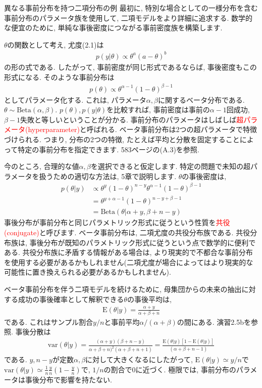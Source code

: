 \documentclass[10pt,dvipdfmx,a4]{beamer}
\newcommand{\eqn}[1]{\begin{align*}#1\end{align*}}
\newcommand{\tcr}[1]{\textcolor{red}{#1}}
\begin{document}
\begin{frame}{異なる事前分布を持つ二項分布の例}
最初に, 特別な場合としての一様分布を含む事前分布のパラメータ族を使用して, 二項モデルをより詳細に追求する.
数学的な便宜のために, 単純な事後密度につながる事前密度族を構築します.

$\theta$の関数として考え, 尤度(2.1)は
\eqn{p(y|\theta)\propto \theta^a(a-\theta)^b}
の形の式である.
したがって, 事前密度が同じ形式であるならば, 事後密度もこの形式になる.
そのような事前分布は
\eqn{p(\theta)\propto \theta^{\alpha-1}(1-\theta)^{\beta-1}}
としてパラメータ化する.
これは, パラメータ$\alpha, \beta$に関するベータ分布である.
$\theta\sim \text{Beta}(\alpha,\beta)$.
$p(\theta), p(y|\theta)$を比較すれば, 事前密度は事前の$\alpha-1$回成功, $\beta-1$失敗と等しいということが分かる.
事前分布のパラメータはしばしば\tcr{超パラメータ(hyperparameter)}と呼ばれる.
ベータ事前分布は2つの超パラメータで特徴づけられる.
つまり, 分布の2つの特徴, たとえば平均と分散を固定することによって特定の事前分布を指定できます.
583ページの(A.3)を参照.
\end{frame}


\begin{frame}
今のところ, 合理的な値$\alpha, \beta$を選択できると仮定します.
特定の問題で未知の超パラメータを扱うための適切な方法は, 5章で説明します.
$\theta$の事後密度は,
\eqn{p(\theta|y)&\propto \theta^y(1-\theta)^{n-y}\theta^{\alpha-1}(1-\theta)^{\beta-1}\\
&=\theta^{y+\alpha-1}(1-\theta)^{n-y+\beta-1}\\
&=\text{Beta}(\theta|\alpha+y,\beta+n-y)}
事後分布が事前分布と同じパラメトリック形式に従うという性質を\tcr{共役(conjugate)}と呼びます.
ベータ事前分布は, 二項尤度の共役分布族である.
共役分布族は, 事後分布が既知のパラメトリック形式に従うという点で数学的に便利である.
共役分布族に矛盾する情報がある場合は, より現実的で不都合な事前分布を使用する必要があるかもしれません(二項尤度が場合によってはより現実的な可能性に置き換えられる必要があるかもしれません).
\end{frame}


\begin{frame}
ベータ事前分布を伴う二項モデルを続けるために, 母集団からの未来の抽出に対する成功の事後確率として解釈できる$\theta$の事後平均は,
\eqn{\text{E}(\theta|y)=\frac{\alpha+y}{\alpha+\beta+n}}
である.
これはサンプル割合$y/n$と事前平均$\alpha/(\alpha+\beta)$の間にある.
演習2.5bを参照.
事後分散は
\eqn{\text{var}(\theta|y)=\frac{(\alpha+y)(\beta+n-y)}{\alpha+\beta+n)^2(\alpha+\beta+n+1)}=\frac{\text{E}(\theta|y)[1-\text{E}(\theta|y)]}{(\alpha+\beta+n-1)}}
である.
$y, n-y$が定数$\alpha, \beta$に対して大きくなるにしたがって, $\text{E}(\theta|y)\simeq y/n$で$\text{var}(\theta|y)\simeq \tfrac{1}{n}\tfrac{y}{n}(1-\tfrac{y}{n})$で, $1/n$の割合で0に近づく.
極限では, 事前分布のパラメータは事後分布で影響を持たない.
\end{frame}
\end{document}
